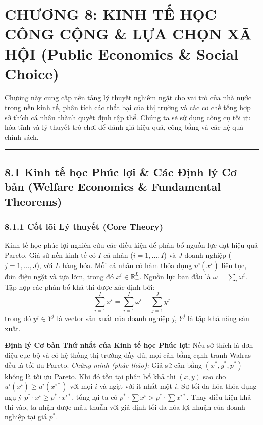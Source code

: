 \documentclass[
]{article}
\begin{document}
\section{CHƯƠNG 8: KINH TẾ HỌC CÔNG CỘNG \& LỰA CHỌN XÃ HỘI (Public
Economics \& Social
Choice)}\label{chux1b0ux1a1ng-8-kinh-tux1ebf-hux1ecdc-cuxf4ng-cux1ed9ng-lux1ef1a-chux1ecdn-xuxe3-hux1ed9i-public-economics-social-choice}

Chương này cung cấp nền tảng lý thuyết nghiêm ngặt cho vai trò của nhà
nước trong nền kinh tế, phân tích các thất bại của thị trường và các cơ
chế tổng hợp sở thích cá nhân thành quyết định tập thể. Chúng ta sẽ sử
dụng công cụ tối ưu hóa tĩnh và lý thuyết trò chơi để đánh giá hiệu quả,
công bằng và các hệ quả chính sách.

\begin{center}\rule{0.5\linewidth}{0.5pt}\end{center}

\subsection{8.1 Kinh tế học Phúc lợi \& Các Định lý Cơ bản (Welfare
Economics \& Fundamental
Theorems)}\label{kinh-tux1ebf-hux1ecdc-phuxfac-lux1ee3i-cuxe1c-ux111ux1ecbnh-luxfd-cux1a1-bux1ea3n-welfare-economics-fundamental-theorems}

\subsubsection{8.1.1 Cốt lõi Lý thuyết (Core
Theory)}\label{cux1ed1t-luxf5i-luxfd-thuyux1ebft-core-theory-24}

Kinh tế học phúc lợi nghiên cứu các điều kiện để phân bổ nguồn lực đạt
hiệu quả Pareto. Giả sử nền kinh tế có \(I\) cá nhân
(\(i = 1, \dots, I\)) và \(J\) doanh nghiệp (\(j = 1, \dots, J\)), với
\(L\) hàng hóa. Mỗi cá nhân có hàm thỏa dụng \(u^i(x^i)\) liên tục, đơn
điệu ngặt và tựa lõm, trong đó \(x^i \in \mathbb{R}^L_+\). Nguồn lực ban
đầu là \(\omega = \sum_i \omega^i\). Tập hợp các phân bổ khả thi được
xác định bởi:
\[ \sum_{i=1}^I x^i = \sum_{i=1}^I \omega^i + \sum_{j=1}^J y^j \] trong
đó \(y^j \in Y^j\) là vector sản xuất của doanh nghiệp \(j\), \(Y^j\) là
tập khả năng sản xuất.

\textbf{Định lý Cơ bản Thứ nhất của Kinh tế học Phúc lợi:} Nếu sở thích
là đơn điệu cục bộ và có hệ thống thị trường đầy đủ, mọi cân bằng cạnh
tranh Walras đều là tối ưu Pareto. \emph{Chứng minh (phác thảo):} Giả sử
cân bằng \((x^*, y^*, p^*)\) không là tối ưu Pareto. Khi đó tồn tại phân
bổ khả thi \((x, y)\) sao cho \(u^i(x^i) \geq u^i(x^{i*})\) với mọi
\(i\) và ngặt với ít nhất một \(i\). Sự tối đa hóa thỏa dụng ngụ ý
\(p^* \cdot x^i \geq p^* \cdot x^{i*}\), tổng lại ta có
\(p^* \cdot \sum x^i > p^* \cdot \sum x^{i*}\). Thay điều kiện khả thi
vào, ta nhận được mâu thuẫn với giả định tối đa hóa lợi nhuận của doanh
nghiệp tại giá \(p^*\).
\end{document}
